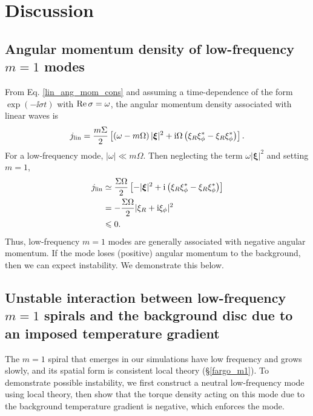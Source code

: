 \section{Discussion}

\subsection{Angular momentum density of  low-frequency $m=1$ modes}
From Eq. \ref{lin_ang_mom_cons} and assuming a time-dependence of the
form $\exp{(-\ii \sigma t)}$ with $\operatorname{Re}{\sigma} = \omega$,  
the angular momentum density associated with linear waves is
\begin{align}
  j_\mathrm{lin} = \frac{m\Sigma}{2}\left[\left(\omega -
      m\Omega\right)|\bm{\xi}|^2 + \mathrm{i}\Omega\left(\xi_R\xi_\phi^* -
      \xi_R\xi_\phi^*\right)\right].  
\end{align}
For a low-frequency mode, $|\omega|\ll m\Omega$. Then neglecting the
term $\omega|\bm{\xi}|^2$ and setting $m=1$,
\begin{align}
  j_\mathrm{lin} &\simeq \frac{\Sigma\Omega}{2}\left[-|\bm{\xi}|^2 + \mathrm{i}\left(\xi_R\xi_\phi^* -
      \xi_R\xi_\phi^*\right)\right]\notag\\
  & = -\frac{\Sigma\Omega}{2}|\xi_R + \mathrm{i}\xi_\phi|^2\notag\\
  & \leqslant 0.
\end{align}
Thus, low-frequency $m=1$ modes are generally associated with negative
angular momentum. If the mode loses (positive) angular momentum
to the background, then we can expect instability. We demonstrate
this below. 

\subsection{Unstable interaction between low-frequency $m=1$ spirals
  and the background disc due to an imposed temperature gradient}
The $m=1$ spiral that emerges in our simulations have low frequency
and grows slowly, and its spatial form is consistent local theory
(\S\ref{fargo_m1}). To demonstrate possible instability, we
first construct a neutral low-frequency mode using local theory, then
show that the torque density acting on this mode due to the background
temperature gradient is negative, which enforces the mode. 

